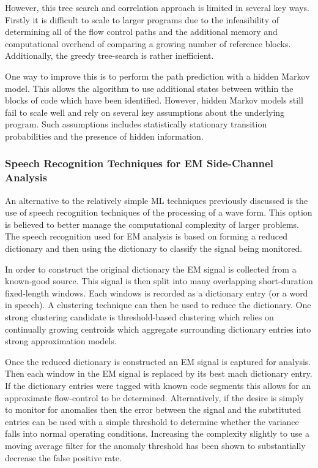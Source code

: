       However, this tree search and correlation approach is limited in several key ways.
      Firstly it is difficult to scale to larger programs due to the infeasibility of determining all of the flow
        control paths and the additional memory and computational overhead of comparing a growing number of reference blocks.
      Additionally, the greedy tree-search is rather inefficient.

      One way to improve this is to perform the path prediction with a hidden Markov model.
      This allows the algorithm to use additional states between within the blocks of code which have been identified.
      However, hidden Markov models still fail to scale well and rely on several key assumptions about the underlying program.
      Such assumptions includes statistically stationary transition probabilities and the presence of hidden information.

    \subsubsection{Speech Recognition Techniques for EM Side-Channel Analysis}
      An alternative to the relatively simple ML techniques previously discussed is the use of speech recognition 
        techniques of the processing of a wave form.
      This option is believed to better manage the computational complexity of larger problems.
      The speech recognition used for EM analysis is based on forming a reduced dictionary and then using the dictionary 
        to classify the signal being monitored.

      In order to construct the original dictionary the EM signal is collected from a known-good source.
      This signal is then split into many overlapping short-duration fixed-length windows. 
      Each windows is recorded as a dictionary entry (or a word in speech).
      A clustering technique can then be used to reduce the dictionary.
      One strong clustering candidate is threshold-based clustering which relies on continually growing centroids
        which aggregate surrounding dictionary entries into strong approximation models.
      
      Once the reduced dictionary is constructed an EM signal is captured for analysis.
      Then each window in the EM signal is replaced by its best mach dictionary entry.
      If the dictionary entries were tagged with known code segments this allows for an approximate flow-control to be determined.
      Alternatively, if the desire is simply to monitor for anomalies then the error between the signal and the 
        substituted entries can be used with a simple threshold to determine whether the variance falls into normal operating
        conditions.
      Increasing the complexity slightly to use a moving average filter for the anomaly threshold has been shown to 
        substantially decrease the false positive rate.

